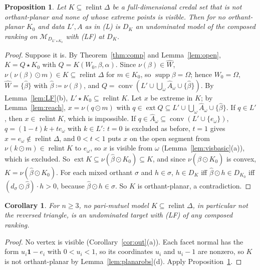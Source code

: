 \documentclass[11pt]{article}
\newcommand{\one}{\mathbf{1}}
\newcommand{\M}{\mathcal{M}}
\DeclareMathOperator{\conv}{conv}
\DeclareMathOperator{\relint}{relint}
\DeclareMathOperator{\supp}{supp}
\DeclareMathOperator{\ext}{ext}
\theoremstyle{plain}
\newtheorem{proposition}[theorem]{Proposition}
\newtheorem{corollary}[theorem]{Corollary}
\theoremstyle{definition}
\theoremstyle{remark}
\begin{document}
\begin{proposition}\label{prop:compexcl}
Let $K\subseteq\relint\Delta$ be a full-dimensional credal set that is not orthant-planar
and none of whose extreme points is visible. Then for no orthant-planar $K_0$ and data
$L',A$ as in (L) is $D_K$ an undominated model of the composed ranking on
$\M_{D_{L'\star K_0}}$ with (LF) at $D_K$.
\end{proposition}

\begin{proof}
Suppose it is. By Theorem~\ref{thm:comp} and Lemma~\ref{lem:open}, $K=Q\star K_0$ with
$Q=K(W_0,\beta,\alpha)$. Since $\nu(\beta)\in\hat W$, $\nu(\nu(\beta)\odot m)\in K\subseteq
\relint\Delta$ for $m\in K_0$, so $\supp\beta=\Omega$; hence $W_0=\Omega$, $\hat W=\{\hat
\beta\}$ with $\hat\beta\coloneqq\nu(\beta)$, and $Q=\conv(L'\cup\bigcup_\omega\hat
A_\omega\cup\{\hat\beta\})$. By Lemma~\ref{lem:LF}(b), $L'\star K_0\subseteq\relint K$. Let
$x$ be extreme in $K$; by Lemma~\ref{lem:reach}, $x=\nu(q\odot m)$ with $q\in\ext Q
\subseteq L'\cup\bigcup_\omega\hat A_\omega\cup\{\hat\beta\}$. If $q\in L'$, then
$x\in\relint K$, which is impossible. If $q\in\hat A_\omega\subseteq\conv(L'\cup\{e_\omega
\})$, $q=(1-t)k+te_\omega$ with $k\in L'$: $t=0$ is excluded as before, $t=1$ gives $x=
e_\omega\notin\relint\Delta$, and $0<t<1$ puts $x$ on the open segment from $\nu(k\odot m)\in
\relint K$ to $e_\omega$, so $x$ is visible from $\omega$ (Lemma~\ref{lem:visbasic}(a)),
which is excluded. So $\ext K\subseteq\nu(\hat\beta\odot K_0)\subseteq K$, and since
$\nu(\hat\beta\odot K_0)$ is convex, $K=\nu(\hat\beta\odot K_0)$. For each mixed orthant
$\sigma$ and $h\in\sigma$, $h\in D_K$ iff $\hat\beta\odot h\in D_{K_0}$ iff $(d_\sigma\odot
\hat\beta)\cdot h>0$, because $\hat\beta\odot h\in\sigma$. So $K$ is orthant-planar, a
contradiction.
\end{proof}

\begin{corollary}\label{cor:comppmm}
For $n\ge3$, no pari-mutuel model $K\subseteq\relint\Delta$, in particular not the
reversed triangle, is an undominated target with (LF) of any composed ranking.
\end{corollary}

\begin{proof}
No vertex is visible (Corollary~\ref{cor:out}(a)). Each facet normal has the form
$u_i\one-e_i$ with $0<u_i<1$, so its coordinates $u_i$ and $u_i-1$ are nonzero, so $K$ is not orthant-planar by
Lemma~\ref{lem:planarobs}(d). Apply Proposition~\ref{prop:compexcl}.
\end{proof}
\end{document}
